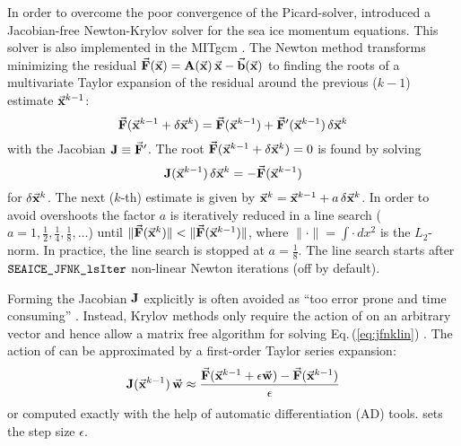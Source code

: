 In order to overcome the poor convergence of the Picard-solver,
\citet{lemieux10} introduced a Jacobian-free Newton-Krylov solver for
the sea ice momentum equations. This solver is also implemented in the
MITgcm \citep{losch14:_jfnk}. The Newton method transforms minimizing
the residual $\vec{\mathbf{F}}(\vec{\mathbf{x}}) = \mathbf{A}(\vec{\mathbf{x}})\,\vec{\mathbf{x}} -
\vec{\mathbf{b}}(\vec{\mathbf{x}})$ to finding the roots of a multivariate Taylor
expansion of the residual  around the previous ($k-1$) estimate
$\vec{\mathbf{x}}^{k-1}$:
\begin{equation}
  \label{eq:jfnktaylor}
  \vek{F}(\vek{x}^{k-1}+\delta\vek{x}^{k}) = 
  \vek{F}(\vek{x}^{k-1}) + \vek{F}'(\vek{x}^{k-1})\,\delta\vek{x}^{k}
\end{equation}
with the Jacobian $\mathbf{J}\equiv\vec{\mathbf{F}}'$. The root
$\vec{\mathbf{F}}(\vec{\mathbf{x}}^{k-1}+\delta\vec{\mathbf{x}}^{k})=0$ is found by solving
\begin{equation}
  \label{eq:jfnklin}
  \mat{J}(\vek{x}^{k-1})\,\delta\vek{x}^{k} = -\vek{F}(\vek{x}^{k-1})
\end{equation}
for $\delta\vec{\mathbf{x}}^{k}$. The next ($k$-th) estimate is given by
$\vec{\mathbf{x}}^{k}=\vec{\mathbf{x}}^{k-1}+a\,\delta\vec{\mathbf{x}}^{k}$. In order to avoid
overshoots the factor $a$ is iteratively reduced in a line search
($a=1, \frac{1}{2}, \frac{1}{4}, \frac{1}{8}, \ldots$) until
$\|\vec{\mathbf{F}}(\vec{\mathbf{x}}^k)\| < \|\vec{\mathbf{F}}(\vec{\mathbf{x}}^{k-1})\|$, where
$\|\cdot\|=\int\cdot\,dx^2$ is the $L_2$-norm. In practice, the line
search is stopped at $a=\frac{1}{8}$. The line search starts after
$\texttt{SEAICE\_JFNK\_lsIter}$ non-linear Newton iterations (off by
default).


Forming the Jacobian $\mathbf{J}$ explicitly is often avoided as ``too
error prone and time consuming'' \citep{knoll04:_jfnk}. Instead,
Krylov methods only require the action of  on an arbitrary
vector  and hence allow a matrix free algorithm for solving
Eq.\,(\ref{eq:jfnklin}) \citep{knoll04:_jfnk}. The action of 
can be approximated by a first-order Taylor series expansion:
\begin{equation}
  \label{eq:jfnkjacvecfd}
  \mat{J}(\vek{x}^{k-1})\,\vek{w} \approx
  \frac{\vek{F}(\vek{x}^{k-1}+\epsilon\vek{w}) - \vek{F}(\vek{x}^{k-1})}
  {\epsilon} 
\end{equation}
or computed exactly with the help of automatic differentiation (AD)
tools.  sets the step size
$\epsilon$. 

